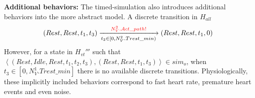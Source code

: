 \textbf{Additional behaviors: }The timed-simulation also introduces additional behaviors into the more abstract model. A discrete transition in $H_{all}$
$$(Rest,Rest,t_1,t_3)\xrightarrow[t_3\in [0, N^2_V.Trest\_min)]{\textcolor{red}{N^2_V.Act\_path!}}(Rest,Rest,t_1,0)$$
However, for a state in $H_{vt}'''$ such that $\left\langle (Rest,Idle,Rest,t_1,t_2,t_3),(Rest,Rest,t_1,t_3)\right\rangle\in sim_o$, when $t_3\in [0, N^1_V.Trest\_min]$ there is no available discrete transitions. Physiologically, these implicitly included behaviors correspond to fast heart rate, premature heart events and even noise.


%




